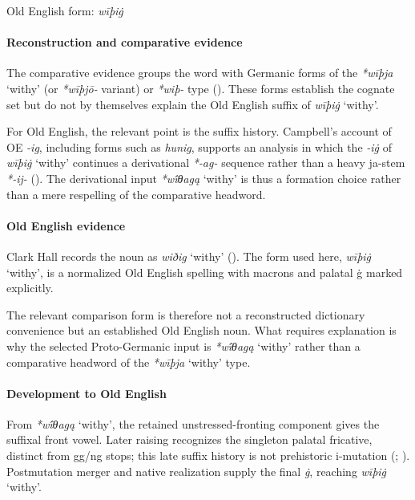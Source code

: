 \documentclass[
  british,
  a4paper,
]{article}
\providecommand{\Recon}[1]{\emph{*#1}}
\begin{document}
Old English form: \emph{wīþiġ}

\paragraph{Reconstruction and comparative
evidence}\label{reconstruction-and-comparative-evidence-122}

The comparative evidence groups the word with Germanic forms of the
\Recon{wīþja} `withy' (or \emph{*wīþjō-} variant) or \emph{*wiþ-} type
(). These forms establish the
cognate set but do not by themselves explain the Old English suffix of
\emph{wīþiġ} `withy'.

For Old English, the relevant point is the suffix history. Campbell's
account of OE \emph{-ig}, including forms such as \emph{hunig}, supports
an analysis in which the \emph{-iġ} of \emph{wīþiġ} `withy' continues a
derivational \emph{*-ag-} sequence rather than a heavy ja-stem
\emph{*-ij-} (). The derivational input \Recon{wī́θagą} `withy' is thus a formation
choice rather than a mere respelling of the comparative headword.

\paragraph{Old English evidence}\label{old-english-evidence-124}

Clark Hall records the noun as {\emph{wiðig}} `withy'
(). The form used
here, {\emph{wīþiġ}} `withy', is a normalized Old English spelling with
macrons and palatal ġ marked explicitly.

The relevant comparison form is therefore not a reconstructed dictionary
convenience but an established Old English noun. What requires
explanation is why the selected Proto-Germanic input is \Recon{wī́θagą}
`withy' rather than a comparative headword of the \Recon{wīþja} `withy'
type.

\paragraph{Development to Old
English}\label{development-to-old-english-122}

From \Recon{wī́θagą} `withy', the retained unstressed-fronting component
gives the suffixal front vowel. Later raising recognizes the singleton
palatal fricative, distinct from gg/ng stops; this late suffix history
is not prehistoric i-mutation (; ).
Postmutation merger and native realization supply the final \emph{ġ},
reaching {\emph{wīþiġ}} `withy'.
\end{document}
